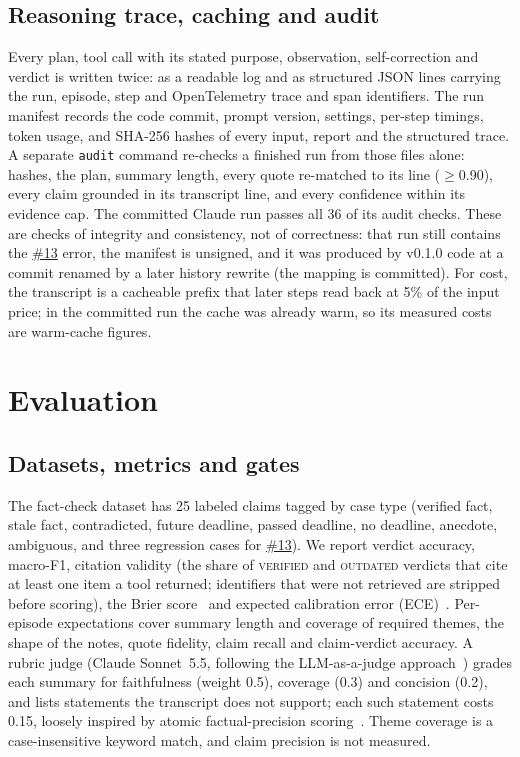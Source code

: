\documentclass[11pt]{article}
\newcommand{\code}[1]{\texttt{#1}}
\newcommand{\V}{\textsc{verified}}
\newcommand{\Ou}{\textsc{outdated}}
\newcommand{\gh}[1]{\href{https://github.com/Organized-AI/podcast-agent/issues/#1}{\##1}}
\begin{document}
\subsection{Reasoning trace, caching and audit}
Every plan, tool call with its stated purpose, observation, self-correction and verdict is written twice: as a readable log and as structured JSON lines carrying the run, episode, step and OpenTelemetry trace and span identifiers. The run manifest records the code commit, prompt version, settings, per-step timings, token usage, and SHA-256 hashes of every input, report and the structured trace. A separate \code{audit} command re-checks a finished run from those files alone: hashes, the plan, summary length, every quote re-matched to its line ($\ge$0.90), every claim grounded in its transcript line, and every confidence within its evidence cap. The committed Claude run passes all 36 of its audit checks. These are checks of integrity and consistency, not of correctness: that run still contains the \gh{13} error, the manifest is unsigned, and it was produced by v0.1.0 code at a commit renamed by a later history rewrite (the mapping is committed). For cost, the transcript is a cacheable prefix that later steps read back at 5\% of the input price; in the committed run the cache was already warm, so its measured costs are warm-cache figures.

\section{Evaluation}\label{sec:eval}

\subsection{Datasets, metrics and gates}
The fact-check dataset has 25 labeled claims tagged by case type (verified fact, stale fact, contradicted, future deadline, passed deadline, no deadline, anecdote, ambiguous, and three regression cases for \gh{13}). We report verdict accuracy, macro-F1, citation validity (the share of \V{} and \Ou{} verdicts that cite at least one item a tool returned; identifiers that were not retrieved are stripped before scoring), the Brier score~\citep{brier1950} and expected calibration error (ECE)~\citep{guo2017calibration}. Per-episode expectations cover summary length and coverage of required themes, the shape of the notes, quote fidelity, claim recall and claim-verdict accuracy. A rubric judge (Claude Sonnet~5.5, following the LLM-as-a-judge approach~\citep{zheng2023judging}) grades each summary for faithfulness (weight 0.5), coverage (0.3) and concision (0.2), and lists statements the transcript does not support; each such statement costs 0.15, loosely inspired by atomic factual-precision scoring~\citep{min2023factscore}. Theme coverage is a case-insensitive keyword match, and claim precision is not measured.
\end{document}
